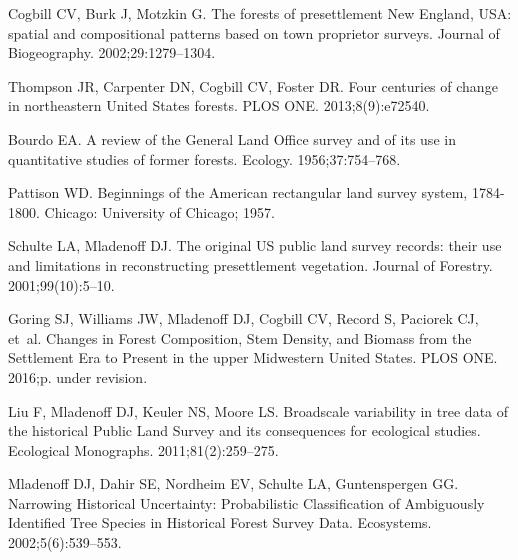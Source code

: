 \documentclass[10pt,letterpaper]{article}
\begin{document}
\nolinenumbers

%
%
% 

\begin{thebibliography}{10}

Cogbill CV, Burk J, Motzkin G.
\newblock The forests of presettlement {N}ew {E}ngland, {USA}: spatial and
  compositional patterns based on town proprietor surveys.
\newblock Journal of Biogeography. 2002;29:1279--1304.

Thompson JR, Carpenter DN, Cogbill CV, Foster DR.
\newblock Four centuries of change in northeastern {United States} forests.
\newblock PLOS ONE. 2013;8(9):e72540.

Bourdo EA.
\newblock A review of the {G}eneral {L}and {O}ffice survey and of its use in
  quantitative studies of former forests.
\newblock Ecology. 1956;37:754--768.

Pattison WD.
\newblock Beginnings of the American rectangular land survey system, 1784-1800.
\newblock Chicago: University of Chicago; 1957.

Schulte LA, Mladenoff DJ.
\newblock The original {US} public land survey records: their use and
  limitations in reconstructing presettlement vegetation.
\newblock Journal of Forestry. 2001;99(10):5--10.

Goring SJ, Williams JW, Mladenoff DJ, Cogbill CV, Record S, Paciorek CJ, et~al.
\newblock Changes in Forest Composition, Stem Density, and Biomass from the
  Settlement Era to Present in the upper {M}idwestern {U}nited {S}tates.
\newblock PLOS ONE. 2016;p. under revision.

Liu F, Mladenoff DJ, Keuler NS, Moore LS.
\newblock Broadscale variability in tree data of the historical Public Land
  Survey and its consequences for ecological studies.
\newblock Ecological Monographs. 2011;81(2):259--275.

Mladenoff DJ, Dahir SE, Nordheim EV, Schulte LA, Guntenspergen GG.
\newblock Narrowing Historical Uncertainty: Probabilistic Classification of
  Ambiguously Identified Tree Species in Historical Forest Survey Data.
\newblock Ecosystems. 2002;5(6):539--553.


\end{thebibliography}
\end{document}
